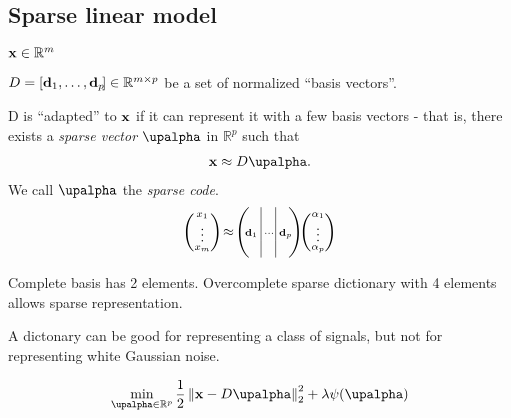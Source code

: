 \begin{compactdesc}
\section{Sparse linear  model}
	\item[\lp{Signal}] $\bm{\mathrm{x}} \in \mathbb{R}^m$
	\item[\lp{Dictionary}] $D=[ \bm{\mathrm{d}}_1,\ldots,\bm{\mathrm{d}}_p\! ]\in \mathbb{R}^{m\times p}$ be a set of normalized ``basis vectors''.
	\item[\lp{sparse vector \& code}]
		D is ``adapted'' to $\bm{\mathrm{x}}$ if it can represent it with a few basis vectors - that is, there exists a \emph{sparse vector} $\vtr{\upalpha}$ in $\mathbb{R}^p$ such that 
		\begin{gather*}
			\vtr{x}\approx D\vtr{\upalpha}.
		\end{gather*}
		We call $\vtr{\upalpha}$ the \emph{sparse code}.
		\begin{gather*}
			\!\left(\!\begin{smallmatrix}
				x_1\\
				\vdots\\
				x_m\\[-1ex]
				\\
			\end{smallmatrix}\!\right)\!
			\approx\!
			\left(\!\!\!
			\begin{array}[]{r|r|l}
				&&\\
				\!\!\scriptstyle\vtr{d}_1\!\!&\!\!\!\!\scriptstyle\cdots\!\!\!&\scriptstyle\!\!\vtr{d}_p\!\!\\
				&&\\
			\end{array}\!\!\!
			\right)\!
			\!\left(\!\begin{smallmatrix}
				\alpha_1\\
				\vdots\\
				\alpha_p
			\end{smallmatrix}\!\right)\!
		\end{gather*}
	\item[\lp{2D example}] Complete basis has 2 elements. Overcomplete sparse dictionary with 4 elements allows sparse representation.
	\item[\lp{Idea}] A dictonary can be good for representing a class of signals, but not for representing white Gaussian noise.
	\item[\lp{Sparse Decomposition problem}]
		\begin{gather*}
			\min_{\vtr{\upalpha}\in \mathbb{R}^p}\frac{1}{2}\norm{\vtr{x}-D\vtr{\upalpha}}_{2}^{2}+\lambda\psi(\vtr{\upalpha})\\

\end{gather*}
\end{compactdesc}
